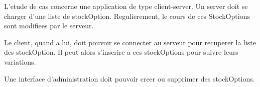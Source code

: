 L'etude de cas concerne une application de type client-server. Un server doit se charger d'une liste de stockOption. Regulierement, le cours de ces StockOptions sont modifiees par le serveur. 

Le client, quand a lui, doit pouvoir se connecter au serveur pour recuperer la liste des stockOption. Il peut alors s'inscrire a ces stockOptions pour suivre leurs variations. 

Une interface d'administration doit pouvoir creer ou supprimer des stockOptions.